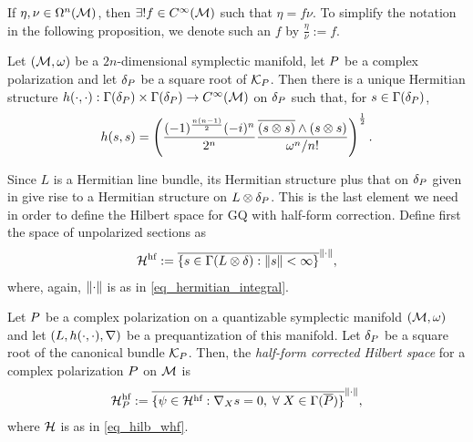 \documentclass[notas.tex]{subfiles}
\begin{document}
If $\eta, \nu \in \Omega^n(\mathcal{M})$, then $\exists ! f \in C^\infty(\mathcal{M})$ such that $\eta = f \nu$. To simplify the notation in the following proposition, we denote such an $f$ by $\frac{\eta}{\nu} := f$.
\begin{prop}\label{prop_sqrtb_hermitian_struct}
	Let $(\mathcal{M}, \omega)$ be a $2n$-dimensional symplectic manifold, let $P$ be a complex polarization and let $\delta_P$ be a square root of $\mathcal{K}_P$. Then there is a unique Hermitian structure $h(\cdot,\cdot): \Gamma(\delta_P) \times \Gamma(\delta_P) \to C^\infty(\mathcal{M})$ on $\delta_P$ such that, for $s \in \Gamma(\delta_P)$,
	\begin{align*}
		h(s,s) = \left( \frac{(-1)^{\frac{n(n-1)}{2}}(-i)^n}{2^n} \frac{\overline{(s \otimes s)}\wedge(s\otimes s)}{\omega^n/n!} \right)^\frac{1}{2}.
	\end{align*}
\end{prop}
Since $L$ is a Hermitian line bundle, its Hermitian structure plus that on $\delta_P$ given in   give rise to a Hermitian structure on $L \otimes \delta_P$. This is the last element we need in order to define the Hilbert space for GQ with half-form correction. Define first the space of unpolarized sections as 
\begin{align}\label{eq_hilb_whf}
	\mathcal{H}^\text{hf} := \overline{\{s \in \Gamma(L \otimes \delta): \left\lVert s\right\rVert < \infty \}}^{\left\lVert\cdot\right\rVert},
\end{align}
where, again, $\left\lVert\cdot\right\rVert$ is as in \eqref{eq_hermitian_integral}.
\begin{defn}
	Let $P$ be a complex polarization on a quantizable symplectic manifold $(\mathcal{M}, \omega)$ and let $(L, h(\cdot,\cdot), \nabla)$ be a prequantization of this manifold. Let $\delta_P$ be a square root of the canonical bundle $\mathcal{K}_P$.  Then, the \emph{half-form corrected Hilbert space} for a complex polarization $P$ on $\mathcal{M}$ is
	\begin{align} \label{eq_reduced_hilb_whf}
		\hilb^\text{hf}_\pol := \close{\{\psi \in \hilb^\text{hf}: \covd{X} s = 0, \; \forall X \in \Gamma(\overline{\pol})\}}^{\norm{\cdot}},
	\end{align}
	where $\mathcal{H}$ is as in \eqref{eq_hilb_whf}.
\end{defn}
\end{document}
